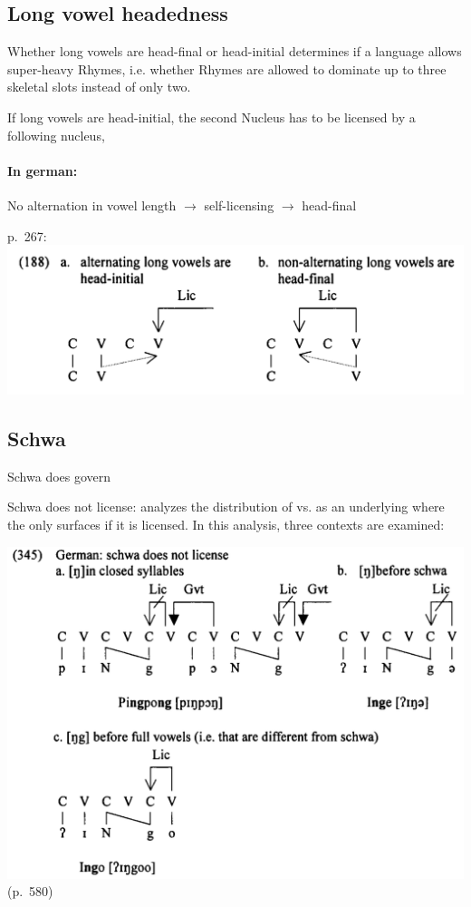 \subsection{Long vowel headedness}
Whether long vowels are head-final or head-initial determines
if a language allows super-heavy Rhymes, i.e. whether Rhymes are
allowed to dominate up to three skeletal slots instead of only two.

If long vowels are head-initial, the second Nucleus has to be
licensed by a following nucleus, \TODO{}

\paragraph{In german:}
No alternation in vowel length $\to$ self-licensing $\to$ head-final


p.~267:~\includegraphics[width=.5\textwidth]{figures/long-vowel-headedness.png}


\subsection[Schwa]{Schwa\footnotemark}
Schwa does govern

Schwa does not license: \cite{scheer2004} analyzes the distribution
of \textipa{[N]} vs. \textipa{[Ng]} as an underlying 
where the  only surfaces if it is licensed.
In this analysis, three contexts are examined:

\includegraphics[width=.7\textwidth]{figures/ng-three-contexts.png}
(p.~580)

